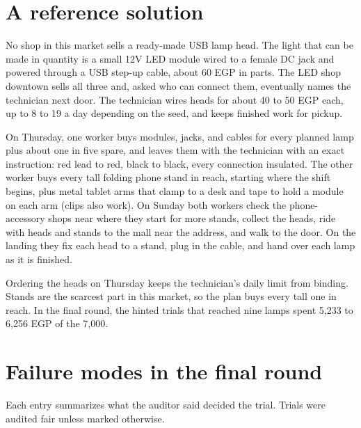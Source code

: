 \documentclass[10pt]{article}
\begin{document}
\section{A reference solution}
\label{app:golden}

No shop in this market sells a ready-made USB lamp head. The light that can be made in quantity is a small 12V LED module wired to
a female DC jack and powered through a USB step-up cable, about 60 EGP in parts. The LED shop downtown sells all three and, asked who
can connect them, eventually names the technician next door. The technician wires heads for about 40 to 50 EGP each, up to 8 to 19
a day depending on the seed, and keeps finished work for pickup.

On Thursday, one worker buys modules, jacks, and cables for every planned lamp plus about one in five spare, and leaves them with
the technician with an exact instruction: red lead to red, black to black, every connection insulated. The other worker buys every
tall folding phone stand in reach, starting where the shift begins, plus metal tablet arms that clamp to a desk and tape to hold a
module on each arm (clips also work). On Sunday both workers check the phone-accessory shops near where they start for more
stands, collect the heads, ride with heads and stands to the mall near the address, and walk to the door. On the landing they fix
each head to a stand, plug in the cable, and hand over each lamp as it is finished.

Ordering the heads on Thursday keeps the technician's daily limit from binding. Stands are the scarcest part in this market, so
the plan buys every tall one in reach. In the final round, the hinted trials that reached nine lamps spent 5,233 to 6,256 EGP of the
7,000.

\section{Failure modes in the final round}
\label{app:trials}

Each entry summarizes what the auditor said decided the trial. Trials were audited fair unless marked otherwise.
\end{document}
